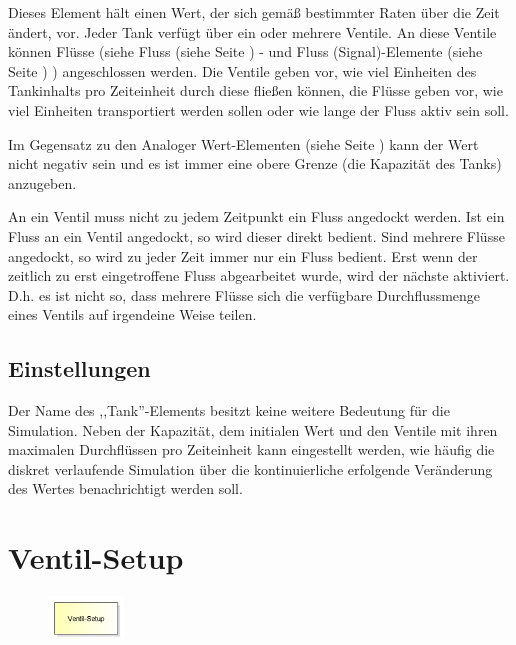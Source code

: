 Dieses Element hält einen Wert, der sich gemäß bestimmter Raten über die Zeit ändert, vor.
Jeder Tank verfügt über ein oder mehrere Ventile. An diese Ventile können Flüsse
(siehe Fluss (siehe Seite \pageref{ref:ModelElementTankFlowByClient}) - und
Fluss (Signal)-Elemente (siehe Seite \pageref{ref:ModelElementTankFlowBySignal}) ) angeschlossen werden.
Die Ventile geben vor, wie viel Einheiten des Tankinhalts pro Zeiteinheit durch diese
fließen können, die Flüsse geben vor, wie viel Einheiten transportiert werden sollen oder
wie lange der Fluss aktiv sein soll.

Im Gegensatz zu den Analoger Wert-Elementen (siehe Seite \pageref{ref:ModelElementAnalogValue}) 
kann der Wert nicht negativ sein und es ist immer eine obere Grenze (die Kapazität des Tanks)
anzugeben.

An ein Ventil muss nicht zu jedem Zeitpunkt ein Fluss angedockt werden.
Ist ein Fluss an ein Ventil angedockt, so wird dieser direkt bedient.
Sind mehrere Flüsse angedockt, so wird zu jeder Zeit immer nur ein Fluss bedient.
Erst wenn der zeitlich zu erst eingetroffene Fluss abgearbeitet wurde, wird der nächste
aktiviert. D.h. es ist nicht so, dass mehrere Flüsse sich die verfügbare Durchflussmenge
eines Ventils auf irgendeine Weise teilen.

\subsection*{Einstellungen}

Der Name des ,,Tank''-Elements besitzt keine weitere Bedeutung für die Simulation.
Neben der Kapazität, dem initialen Wert und den Ventile mit ihren maximalen Durchflüssen
pro Zeiteinheit kann eingestellt werden, wie häufig die diskret verlaufende Simulation über die kontinuierliche
erfolgende Veränderung des Wertes benachrichtigt werden soll.


\section{Ventil-Setup}
\label{ref:ModelElementTankValveSetup}

\begin{figure}
\vspace{-22pt}
\includegraphics[width=2cm]{imageModelElementTankValveSetup.png}
\vspace{-22pt}
\end{figure}

